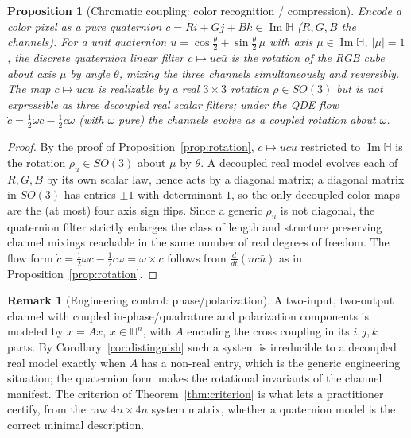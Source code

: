 \documentclass{amsart}
\newtheorem{proposition}[theorem]{Proposition}
\theoremstyle{definition}
\newtheorem{remark}[theorem]{Remark}
\newcommand{\HH}{\mathbb{H}}
\newcommand{\Imag}{\operatorname{Im}}
\begin{document}
\begin{proposition}[Chromatic coupling: color recognition / compression]
\label{prop:color}
Encode a color pixel as a pure quaternion
$c=Ri+Gj+Bk\in\Imag\HH$ ($R,G,B$ the channels). For a unit quaternion
$u=\cos\tfrac\theta2+\sin\tfrac\theta2\,\mu$ with axis $\mu\in\Imag\HH$,
$|\mu|=1$, the discrete
quaternion linear filter $c\mapsto u c\bar u$ is the rotation of the
RGB cube about axis $\mu$ by angle $\theta$, mixing the three channels
\emph{simultaneously and reversibly}. The map $c\mapsto u c\bar u$ is
realizable by a real $3\times3$ rotation $\rho\in SO(3)$ but is
\emph{not} expressible as three decoupled real scalar filters; under the
QDE flow $\dot c=\tfrac12\omega c-\tfrac12 c\omega$ (with $\omega$ pure)
the channels evolve as a coupled rotation about $\omega$.
\end{proposition}

\begin{proof}
By the proof of Proposition~\ref{prop:rotation}, $c\mapsto u c\bar u$
restricted to $\Imag\HH$ is the rotation $\rho_u\in SO(3)$ about $\mu$ by
$\theta$. A decoupled real model evolves each of $R,G,B$ by its own
scalar law, hence acts by a diagonal matrix; a diagonal matrix in
$SO(3)$ has entries $\pm1$ with determinant $1$, so the only decoupled
color maps are the (at most) four axis sign flips. Since a generic
$\rho_u$ is not diagonal, the quaternion filter strictly enlarges the
class of length and structure preserving channel mixings reachable in
the same number of real degrees of freedom. The flow form
$\dot c=\tfrac12\omega c-\tfrac12 c\omega=\omega\times c$ follows from
$\frac{d}{dt}(uc\bar u)$ as in Proposition~\ref{prop:rotation}.
\end{proof}

\begin{remark}[Engineering control: phase/polarization]
A two-input, two-output channel with coupled in-phase/quadrature and
polarization components is modeled by $\dot x=Ax$, $x\in\HH^n$, with
$A$ encoding the cross coupling in its $i,j,k$ parts. By
Corollary~\ref{cor:distinguish} such a system is irreducible to a
decoupled real model exactly when $A$ has a non-real entry, which is the
generic engineering situation; the quaternion form makes the rotational
invariants of the channel manifest. The criterion of
Theorem~\ref{thm:criterion} is what lets a practitioner certify, from
the raw $4n\times4n$ system matrix, whether a quaternion model is the
correct minimal description.
\end{remark}
\end{document}
